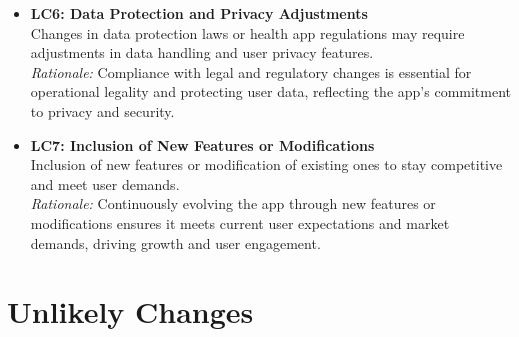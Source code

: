 \documentclass[12pt]{article}
\begin{document}
\begin{itemize}
    \item \textbf{LC6: Data Protection and Privacy Adjustments}\\
    Changes in data protection laws or health app regulations may require adjustments in data handling and user privacy features.\\
    \textit{Rationale:} Compliance with legal and regulatory changes is essential for operational legality and protecting user data, reflecting the app’s commitment to privacy and security.
    
    \item \textbf{LC7: Inclusion of New Features or Modifications}\\
    Inclusion of new features or modification of existing ones to stay competitive and meet user demands.\\
    \textit{Rationale:} Continuously evolving the app through new features or modifications ensures it meets current user expectations and market demands, driving growth and user engagement.
\end{itemize}


\section{Unlikely Changes}
\end{document}
